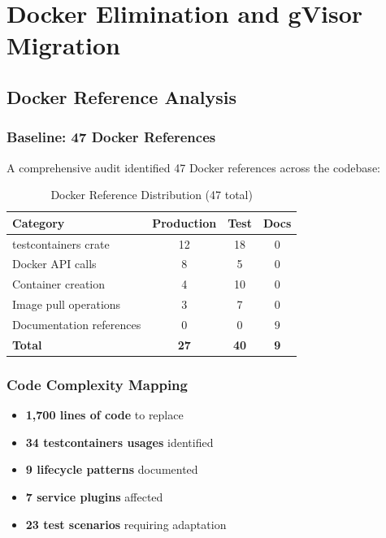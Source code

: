 \documentclass[12pt,twoside,openright]{book}
\theoremstyle{plain}
\theoremstyle{definition}
\theoremstyle{remark}
\begin{document}

\part{Docker Elimination and gVisor Migration}

\chapter{Docker Reference Analysis}

\section{Baseline: 47 Docker References}

A comprehensive audit identified 47 Docker references across the codebase:

\begin{table}[H]
\centering
\begin{tabular}{|l|c|c|c|}
\hline
\textbf{Category} & \textbf{Production} & \textbf{Test} & \textbf{Docs} \\
\hline
testcontainers crate & 12 & 18 & 0 \\
\hline
Docker API calls & 8 & 5 & 0 \\
\hline
Container creation & 4 & 10 & 0 \\
\hline
Image pull operations & 3 & 7 & 0 \\
\hline
Documentation references & 0 & 0 & 9 \\
\hline
\hline
\textbf{Total} & \textbf{27} & \textbf{40} & \textbf{9} \\
\hline
\end{tabular}
\caption{Docker Reference Distribution (47 total)}
\label{tab:docker_refs}
\end{table}

\section{Code Complexity Mapping}

\begin{itemize}
  \item \textbf{1,700 lines of code} to replace
  \item \textbf{34 testcontainers usages} identified
  \item \textbf{9 lifecycle patterns} documented
  \item \textbf{7 service plugins} affected
  \item \textbf{23 test scenarios} requiring adaptation
\end{itemize}
\end{document}
